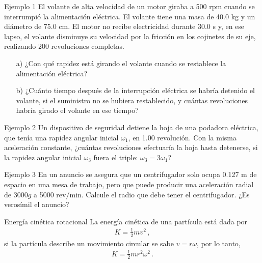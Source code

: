 \begin{frame}{Ejemplo 1}
    El volante de alta velocidad de un motor giraba a 500 rpm cuando se interrumpió la alimentación eléctrica. El volante tiene una masa de 40.0 kg y un diámetro de 75.0 cm. El motor no recibe electricidad durante 30.0 s y, en ese lapso, el volante disminuye su velocidad por la fricción en los cojinetes de su eje, realizando 200 revoluciones completas.

    \begin{itemize}
        \item[a)] ¿Con qué rapidez está girando el volante cuando se restablece la alimentación eléctrica?
        \item[b)] ¿Cuánto tiempo después de la interrupción eléctrica se habría detenido el volante, si el suministro no se hubiera restablecido, y cuántas revoluciones habría girado el volante en ese tiempo?
    \end{itemize}
    
\end{frame}

\begin{frame}{Ejemplo 2}
    Un dispositivo de seguridad detiene la hoja de una podadora eléctrica, que tenía una rapidez angular inicial $\omega_1$, en 1.00 revolución. Con la misma aceleración constante, ¿cuántas revoluciones efectuaría la hoja hasta detenerse, si la rapidez angular inicial $\omega_3$ fuera el triple: $\omega_3=3\omega_1$?
\end{frame}

\begin{frame}{Ejemplo 3}
    En un anuncio se asegura que un centrifugador solo ocupa 0.127 m de espacio en una mesa de trabajo, pero que puede producir una aceleración radial de $3000g$ a 5000 $\text{rev}/\text{min}$. Calcule el radio que debe tener el centrifugador. ¿Es verosímil el anuncio?
\end{frame}

\begin{frame}{Energía cinética rotacional}
    La energía cinética de una partícula está dada por \begin{align*}
        K=\frac{1}{2}mv^2\,,
    \end{align*} si la partícula describe un movimiento circular se sabe $v=r\omega$, por lo tanto, \begin{align*}
        K=\frac{1}{2}mr^2\omega^2\,.
    \end{align*}
\end{frame}

